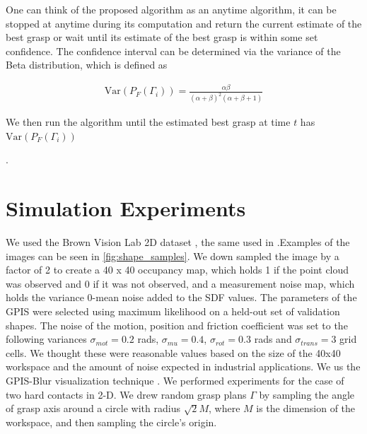\documentclass[journal,transmag]{IEEEtran}%
\begin{document}
One can think of the proposed algorithm as an anytime algorithm, it can be stopped at anytime during its computation and return the current estimate of the best grasp or wait until its estimate of the best grasp is within some set confidence. The confidence interval can be determined via the variance of the Beta distribution, which is defined as 

\vspace{-2ex}
\begin{align}
\mbox{Var}(P_F(\Gamma_i)) = \frac{\alpha\beta}{(\alpha+\beta)^2(\alpha+\beta+1)}
\end{align}

We then run the algorithm until the estimated best grasp at time $t$ has $\mbox{Var}(P_F(\Gamma_i))$

 .
\section{Simulation Experiments}
We used the Brown Vision Lab 2D dataset \cite{brown}, the same used in \cite{christopoulos2007handling}.Examples of the images can be seen in \ref{fig:shape_samples}.  We down sampled the image by a factor of 2 to create a 40 x 40 occupancy map, which holds 1 if the point cloud was observed and 0 if it was not observed, and a measurement noise map, which holds the variance 0-mean noise added to the SDF values. The parameters of the GPIS were selected using maximum likelihood on a held-out set of validation shapes.  The noise of the motion, position and friction coefficient was set to the following variances $\sigma_{mot} = 0.2$ rads, $\sigma_{mu} = 0.4$, $\sigma_{rot} = 0.3$ rads and $\sigma_{trans} = 3$ grid cells.
We thought these were reasonable values based on the size of the 40x40 workspace and the amount of noise expected in industrial applications. 
We us the GPIS-Blur visualization technique \cite{mahler2015gp}.
We performed experiments for the case of two hard contacts in 2-D. We drew random grasp plans $\Gamma$ by sampling the angle of grasp axis around a circle with radius $\sqrt{2} M$, where $M$ is the dimension of the workspace, and then sampling the circle's origin. 
\end{document}
